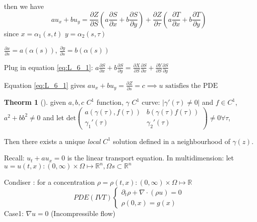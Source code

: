 \documentclass[a4paper]{article}
\theoremstyle{definition}
\newtheorem{theorem}{Theorm}[section]
\begin{document}
	then we have 
	\begin{equation}\label{eq:L_6_1}
		au_x+bu_y=\frac{\partial Z}{\partial S} \left( a \frac{\partial S }{\partial x} +b \frac{\partial S}{\partial y}  \right) +\frac{\partial Z}{\partial  \tau} \left( a \frac{\partial T}{\partial x} +b \frac{\partial T}{\partial y }  \right) 
	\end{equation} 
	since $x=\alpha_1\left( s,t \right) $ $y=\alpha_2\left( s,\tau \right) $

	$\frac{\partial x}{\partial s} =a\left( \alpha\left( s \right)  \right) $, $\frac{\partial y}{\partial s} =b\left( \alpha\left( s \right)  \right) $
	
	Plug in equation \ref{eq:L_6_1}: $a \frac{\partial S}{\partial x} +b \frac{\partial S}{\partial y} =\frac{\partial X}{\partial S} \frac{\partial S}{\partial x} +\frac{\partial Y}{\partial S} \frac{\partial S}{\partial y} $

	Equation \ref{eq:L_6_1} gives $au_x+bu_y=\frac{\partial Z}{\partial s} =c \implies u \text{ satisfies the PDE}$ 

	\begin{theorem}[]
		given $a,b,c$ $C^{1} $ function, $\gamma $ $C^{1} $ curve: $\left| \gamma'\left( \tau \right) \neq 0 \right| $ and $f \in C^{1}$, $a^2+bb^2\neq 0$ and let $\text{det} \begin{pmatrix} a\left( \gamma\left( \tau \right) , f\left( \tau \right)  \right) &b\left( \gamma\left( \tau \right) f\left( \tau \right)  \right) \\
		\gamma_1'\left( \tau \right) &\gamma_2'\left( \tau \right) \end{pmatrix}\neq 0 \forall \tau$, 

		Then there exists a unique \emph{local} $C^{1}$ solution defined in a neighbourhood of $\gamma\left( z \right) $. 
	\end{theorem}
	Recall: $u_t+au_x=0$ is the linear transport equation. In multidimension: let $u=u\left( t,x \right) :\left( 0,\infty \right) \times \Omega \mapsto  \mathbb{R}^{n}, \Omega s\subset \mathbb{R}^{n}$

	Condiser : for a concentration $\rho=\rho\left( t,x \right) :\left( 0,\infty \right) \times \Omega \mapsto \mathbb{R}$ 
	\begin{equation}
		PDE\left( IVT \right) \begin{cases}
			\partial_t\rho+\nabla \cdot \left( \rho u \right) =0\\
			\rho\left( 0,x \right) =g\left( x \right) 
		\end{cases}
	\end{equation} 
	Case1: $\nabla u=0$ (Incompressible flow)
	
\end{document}
